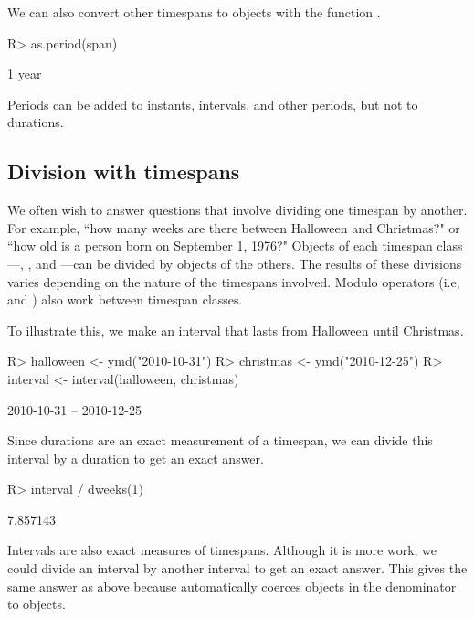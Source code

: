 \documentclass[article]{jss}
\begin{document}
We can also convert other timespans to  objects with the function .

\begin{CodeInput}
R> as.period(span)
\end{CodeInput}
\begin{CodeOutput}
[1] 1 year
\end{CodeOutput}

Periods can be added to instants, intervals, and other periods, but not to durations.


\subsection{Division with timespans}

We often wish to answer questions that involve dividing one timespan by another. For example, ``how many weeks are there between Halloween and Christmas?" or ``how old is a person born on September 1, 1976?" Objects of each timespan class---, , and ---can be divided by objects of the others. The results of these divisions varies depending on the nature of the timespans involved. Modulo operators (i.e, \code{\%\%} and \code{\%/\%}) also work between timespan classes.

To illustrate this, we make an interval that lasts from Halloween until Christmas.

\begin{CodeInput}
R> halloween <- ymd("2010-10-31")
R> christmas <- ymd("2010-12-25")
R> interval <- interval(halloween, christmas)
\end{CodeInput}
\begin{CodeOutput}
[1] 2010-10-31 -- 2010-12-25
\end{CodeOutput}

Since durations are an exact measurement of a timespan, we can divide this interval by a duration to get an exact answer.

\begin{CodeInput}
R> interval / dweeks(1)
\end{CodeInput}
\begin{CodeOutput}
[1] 7.857143
\end{CodeOutput}

Intervals are also exact measures of timespans. Although it is more work, we could divide an interval by another interval to get an exact answer. This gives the same answer as above because  automatically coerces  objects in the denominator to  objects.
\end{document}
